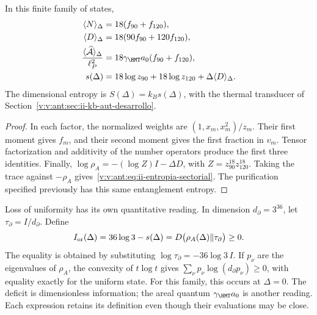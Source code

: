 \begin{proposition}
In this finite family of states,
\begin{align}
 \langle N\rangle_\Delta&=18(f_{90}+f_{120}),\\
 \langle D\rangle_\Delta&=18(90f_{90}+120f_{120}),\\
 \frac{\langle\widehat{\mathcal A}\rangle_\Delta}{\ell_P^2}
 &=18\gamma_{\HMT}a_0(f_{90}+f_{120}),
 \label{v:v:ant:eq:ii-area-media}\\
 s(\Delta)&=18\log z_{90}+18\log z_{120}
                  +\Delta\langle D\rangle_\Delta.
 \label{v:v:ant:eq:ii-entropia-sectorial}
\end{align}
The dimensional entropy is $S(\Delta)=k_Bs(\Delta)$, with the
thermal transducer of Section~\ref{v:v:ant:sec:ii-kb-aut-desarrollo}.
\end{proposition}
\begin{proof}
In each factor, the normalized weights are
$(1,x_m,x_m^2)/z_m$. Their first moment gives $f_m$, and their second
moment gives the first fraction in $v_m$. Tensor factorization
and additivity of the number operators produce the first three
identities. Finally,
$\log\rho_A=-(\log Z)I-\Delta D$, with
$Z=z_{90}^{18}z_{120}^{18}$. Taking the trace against $-\rho_A$
gives~\eqref{v:v:ant:eq:ii-entropia-sectorial}. The purification specified
previously has this same entanglement entropy.
\end{proof}

Loss of uniformity has its own quantitative reading.
In dimension \(d_\partial=3^{36}\), let
\(\tau_\partial=I/d_\partial\). Define
\begin{equation}
 I_{\rm or}(\Delta)=36\log3-s(\Delta)
 =D\bigl(\rho_A(\Delta)\Vert\tau_\partial\bigr)\ge0.
 \label{v:v:ant:eq:ii-area-deficit-informacional}
\end{equation}
The equality is obtained by substituting
\(\log\tau_\partial=-36\log3\,I\). If \(p_\nu\) are the
eigenvalues of \(\rho_A\), the convexity of \(t\log t\) gives
\(\sum_\nu p_\nu\log(d_\partial p_\nu)\ge0\), with equality
exactly for the uniform state. For this family, this occurs at
\(\Delta=0\). The deficit is dimensionless information; the areal
quantum \(\gamma_{\HMT}a_0\) is another reading. Each expression retains
its definition even though their evaluations may be close.

